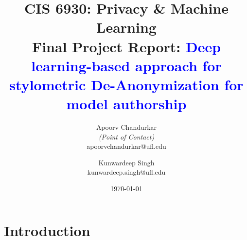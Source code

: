 \documentclass[11pt,letterpaper]{article}
\title{CIS 6930: Privacy \& Machine Learning\\
	\Large Final Project Report: \textcolor{blue}{\bf Deep learning-based approach for stylometric De-Anonymization for model authorship}} %
\author{
        Apoorv Chandurkar \\{\em (Point of Contact)} \\
        apoorvchandurkar@ufl.edu\\
        \and
        Kunwardeep Singh \\
        kunwardeep.singh@ufl.edu\\
}
\date{\today}
\begin{document}

\maketitle





\section{Introduction}
\end{document}
